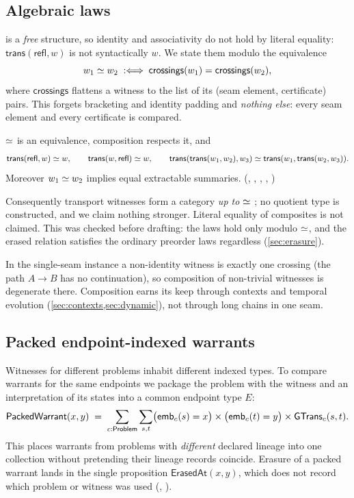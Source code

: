 \subsection{Algebraic laws}\label{sec:laws}
 is a \emph{free} structure, so identity and associativity do not hold by literal equality: $\mathsf{trans}(\mathsf{refl}, w)$ is not syntactically $w$. We state them modulo the equivalence
\[
w_1 \mathrel{\simeq} w_2 \;:\Longleftrightarrow\; \mathsf{crossings}(w_1) = \mathsf{crossings}(w_2),
\]
where $\mathsf{crossings}$ flattens a witness to the list of its (seam element, certificate) pairs. This forgets bracketing and identity padding and \emph{nothing else}: every seam element and every certificate is compared.

\begin{theorem}\label{thm:algebra}
$\mathrel{\simeq}$ is an equivalence, composition respects it, and
\[
\mathsf{trans}(\mathsf{refl},w) \mathrel{\simeq} w, \qquad \mathsf{trans}(w,\mathsf{refl}) \mathrel{\simeq} w, \qquad
\mathsf{trans}(\mathsf{trans}(w_1,w_2),w_3) \mathrel{\simeq} \mathsf{trans}(w_1,\mathsf{trans}(w_2,w_3)).
\]
Moreover $w_1 \mathrel{\simeq} w_2$ implies equal extractable summaries. (, , , , )
\end{theorem}
Consequently transport witnesses form a category \emph{up to $\mathrel{\simeq}$} \cite{maclane1998}; no quotient type is constructed, and we claim nothing stronger. Literal equality of composites is not claimed. This was checked before drafting: the laws hold only modulo $\mathrel{\simeq}$, and the erased relation satisfies the ordinary preorder laws regardless (\cref{sec:erasure}).

\begin{remark}
In the single-seam instance a non-identity witness is exactly one crossing (the path $A \to B$ has no continuation), so composition of non-trivial witnesses is degenerate there. Composition earns its keep through contexts and temporal evolution (\cref{sec:contexts,sec:dynamic}), not through long chains in one seam.
\end{remark}

\subsection{Packed endpoint-indexed warrants}
Witnesses for different problems inhabit different indexed types. To compare warrants for the same endpoints we package the problem with the witness and an interpretation of its states into a common endpoint type $E$:
\[
\mathsf{PackedWarrant}(x,y) \;=\; \sum_{c : \mathsf{Problem}} \sum_{s,t} \bigl(\mathsf{emb}_c(s) = x\bigr) \times \bigl(\mathsf{emb}_c(t) = y\bigr) \times \mathsf{GTrans}_c(s,t).
\]
This places warrants from problems with \emph{different} declared lineage into one collection without pretending their lineage records coincide. Erasure of a packed warrant lands in the single proposition $\mathsf{ErasedAt}(x,y)$, which does not record which problem or witness was used (, ).
